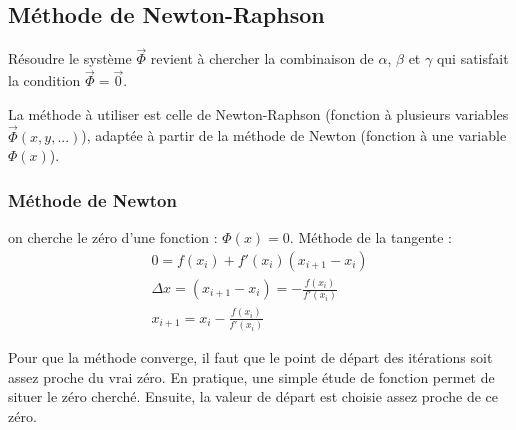 \documentclass[12pt,a4paper]{article}
\begin{document}
\subsection{Méthode de Newton-Raphson}
Résoudre le système $\vec{\Phi}$ revient à chercher la combinaison de $\alpha$, $\beta$ et $\gamma$ qui satisfait la condition $\vec{\Phi}=\vec{0}$.

La méthode à utiliser est celle de Newton-Raphson (fonction à plusieurs variables $\vec{\Phi}(x,y,...)$), adaptée à partir de la méthode de Newton (fonction à une variable $\Phi(x)$).

\subsubsection{Méthode de Newton}
on cherche le zéro d'une fonction : $\Phi(x)=0$. 
Méthode de la tangente : 
\begin{eqnarray}
0 = f(x_i) + f'(x_i) (x_{i+1}-x_i)\\
\Delta x = (x_{i+1}-x_i) = -\frac{f(x_i)}{f'(x_i)}\\
x_{i+1}=x_i -\frac{f(x_i)}{f'(x_i)}
\end{eqnarray}

Pour que la méthode converge, il faut que le point de départ des itérations soit assez proche du vrai zéro. En pratique, une simple étude de fonction permet de situer le zéro cherché. Ensuite, la valeur de départ est choisie assez proche de ce zéro. 
\end{document}

